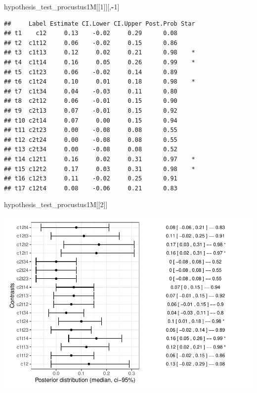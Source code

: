 \documentclass[
]{article}
\newenvironment{Shaded}{\begin{snugshade}}{\end{snugshade}}
\newcommand{\DecValTok}[1]{\textcolor[rgb]{0.00,0.00,0.81}{#1}}
\newcommand{\NormalTok}[1]{#1}
\newcommand{\SpecialCharTok}[1]{\textcolor[rgb]{0.81,0.36,0.00}{\textbf{#1}}}
\begin{document}
\begin{Shaded}
\begin{Highlighting}[]
\NormalTok{hypothesis\_test\_procustus1M[[}\DecValTok{1}\NormalTok{]][,}\SpecialCharTok{{-}}\DecValTok{1}\NormalTok{]}
\end{Highlighting}
\end{Shaded}

\begin{verbatim}
##     Label Estimate CI.Lower CI.Upper Post.Prob Star
## t1    c12     0.13    -0.02     0.29      0.08     
## t2  c1t12     0.06    -0.02     0.15      0.86     
## t3  c1t13     0.12     0.02     0.21      0.98    *
## t4  c1t14     0.16     0.05     0.26      0.99    *
## t5  c1t23     0.06    -0.02     0.14      0.89     
## t6  c1t24     0.10     0.01     0.18      0.98    *
## t7  c1t34     0.04    -0.03     0.11      0.80     
## t8  c2t12     0.06    -0.01     0.15      0.90     
## t9  c2t13     0.07    -0.01     0.15      0.92     
## t10 c2t14     0.07     0.00     0.15      0.94     
## t11 c2t23     0.00    -0.08     0.08      0.55     
## t12 c2t24     0.00    -0.08     0.08      0.55     
## t13 c2t34     0.00    -0.08     0.08      0.52     
## t14 c12t1     0.16     0.02     0.31      0.97    *
## t15 c12t2     0.17     0.03     0.31      0.98    *
## t16 c12t3     0.11    -0.02     0.25      0.91     
## t17 c12t4     0.08    -0.06     0.21      0.83
\end{verbatim}

\begin{Shaded}
\begin{Highlighting}[]
\NormalTok{hypothesis\_test\_procustus1M[[}\DecValTok{2}\NormalTok{]]}
\end{Highlighting}
\end{Shaded}

\includegraphics{06_Publish_GUSO_ASIL_files/figure-latex/Contrasts1M-1.pdf}
\end{document}
